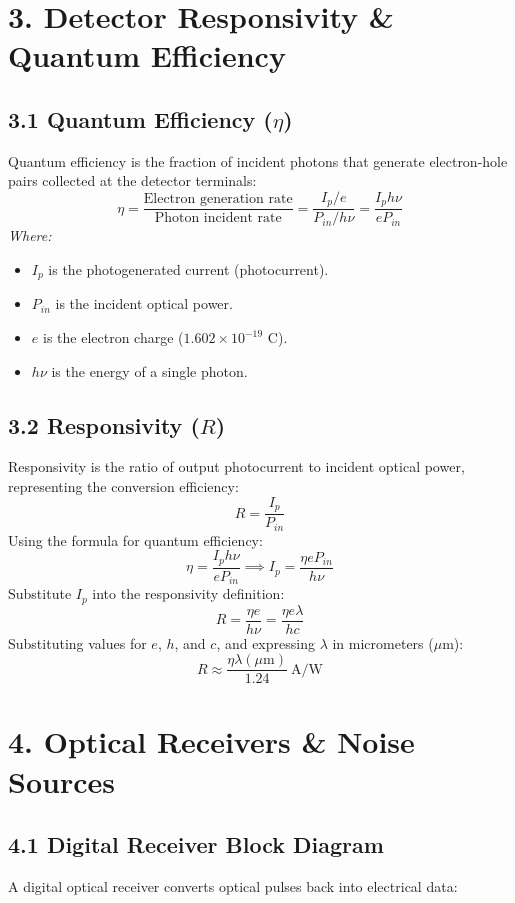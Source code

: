 \section{3. Detector Responsivity \& Quantum Efficiency}

\subsection{3.1 Quantum Efficiency ($\eta$)}
Quantum efficiency is the fraction of incident photons that generate electron-hole pairs collected at the detector terminals:
\[ \eta = \frac{\text{Electron generation rate}}{\text{Photon incident rate}} = \frac{I_p / e}{P_{in} / h\nu} = \frac{I_p h \nu}{e P_{in}} \]
\textit{Where:}
\begin{itemize}
  \item   $I_p$ is the photogenerated current (photocurrent).
  \item   $P_{in}$ is the incident optical power.
  \item   $e$ is the electron charge ($1.602 \times 10^{-19}\text{ C}$).
  \item   $h\nu$ is the energy of a single photon.
\end{itemize}

\subsection{3.2 Responsivity ($R$)}
Responsivity is the ratio of output photocurrent to incident optical power, representing the conversion efficiency:
\[ R = \frac{I_p}{P_{in}} \]
Using the formula for quantum efficiency:
\[ \eta = \frac{I_p h \nu}{e P_{in}} \implies I_p = \frac{\eta e P_{in}}{h\nu} \]
Substitute $I_p$ into the responsivity definition:
\[ R = \frac{\eta e}{h\nu} = \frac{\eta e \lambda}{hc} \]
Substituting values for $e$, $h$, and $c$, and expressing $\lambda$ in micrometers ($\mu\text{m}$):
\[ R \approx \frac{\eta \lambda(\mu\text{m})}{1.24}\ \text{A/W} \]


\section{4. Optical Receivers \& Noise Sources}

\subsection{4.1 Digital Receiver Block Diagram}
A digital optical receiver converts optical pulses back into electrical data:

